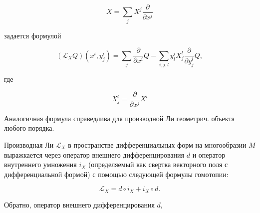 \documentclass[10pt]{article}
\begin{document}
\[

X=\sum_{j} X^{j} \frac{\partial}{\partial x^{j}}

\]



задается формулой



\[

\left(\mathscr{L}_{X} Q\right)\left(x^{i}, y_{j}^{i}\right)=\sum_{j} \frac{\partial}{\partial x^{i}} Q-\sum_{i, j, l} y_{l}^{i} X_{j}^{l} \frac{\partial}{\partial y_{j}^{i}} Q,

\]



где



\[

X_{j}^{l}=\frac{\partial}{\partial x^{j}} X^{l}

\]



Аналогичная формула справедлива для производной Ли геометрич. объекта любого порядка.



Производная Ли $\mathscr{L}_{X}$ в пространстве дифференциальных форм на многообразии $M$ выражкается через оператор внешнего дифференцирования $d$ и оператор внутреннего умножения $i_{X}$ (определяемый как свертка векторного поля с дифференциальной формой) с помощью следующей формулы гомотопии:



\[

\mathscr{L}_{X}=d \circ i_{X}+i_{X} \circ d .

\]



Обратно, оператор внешнего дифференцирования $d$,
\end{document}
